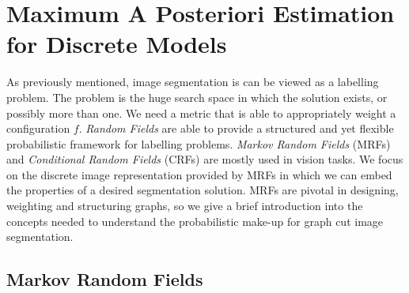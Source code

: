 
\section{Maximum A Posteriori Estimation for Discrete Models}
\label{sec:MAPEstimates}

As previously mentioned, image segmentation is can be viewed as a labelling problem. The problem is the huge search space in which the solution exists, or possibly more than one. We need a metric that is able to appropriately weight a configuration $f$. \textit{Random Fields} are able to provide a structured and yet flexible probabilistic framework for labelling problems. \textit{Markov Random Fields} (MRFs) and \textit{Conditional Random Fields} (CRFs) are mostly used in vision tasks. We focus on the discrete image representation provided by MRFs in which we can embed the properties of a desired segmentation solution. MRFs are pivotal in designing, weighting and structuring graphs, so we give a brief introduction into the concepts needed to understand the probabilistic make-up for graph cut image segmentation.


\subsection{Markov Random Fields}
\label{sec:MarkovRandomFields}

